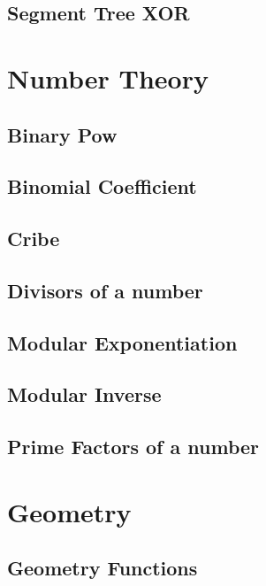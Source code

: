 \subsection{Segment Tree XOR}
\raggedbottom
\hrulefill

\section{Number Theory}
\subsection{Binary Pow}
\raggedbottom
\hrulefill
\subsection{Binomial Coefficient}
\raggedbottom
\hrulefill
\subsection{Cribe}
\raggedbottom
\hrulefill
\subsection{Divisors of a number}
\raggedbottom
\hrulefill
\subsection{Modular Exponentiation}
\raggedbottom
\hrulefill
\subsection{Modular Inverse}
\raggedbottom
\hrulefill
\subsection{Prime Factors of a number}
\raggedbottom
\hrulefill

\section{Geometry}
\subsection{Geometry Functions}
\raggedbottom
\hrulefill
